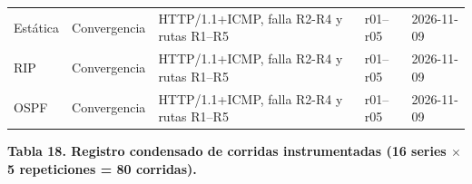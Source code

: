 \documentclass[11pt,a4paper]{article}
\newcommand{\figcaption}[1]{\par\noindent\footnotesize\textbf{#1}\par\vspace{0.4cm}}
\begin{document}
\begin{center}
\begin{minipage}{0.96\linewidth}
\begin{tabular}{@{}p{1.7cm}p{2.1cm}p{5.1cm}p{1.6cm}p{2.1cm}@{}}
Est\'atica & Convergencia & HTTP/1.1+ICMP, falla R2-R4 y rutas R1--R5 & r01--r05 & 2026-11-09 \\
RIP & Convergencia & HTTP/1.1+ICMP, falla R2-R4 y rutas R1--R5 & r01--r05 & 2026-11-09 \\
OSPF & Convergencia & HTTP/1.1+ICMP, falla R2-R4 y rutas R1--R5 & r01--r05 & 2026-11-09 \\
\bottomrule
\end{tabular}
\par\vspace{0.1cm}
\figcaption{Tabla 18. Registro condensado de corridas instrumentadas (16 series $\times$ 5 repeticiones = 80 corridas).}
\end{minipage}
\end{center}
\end{document}
